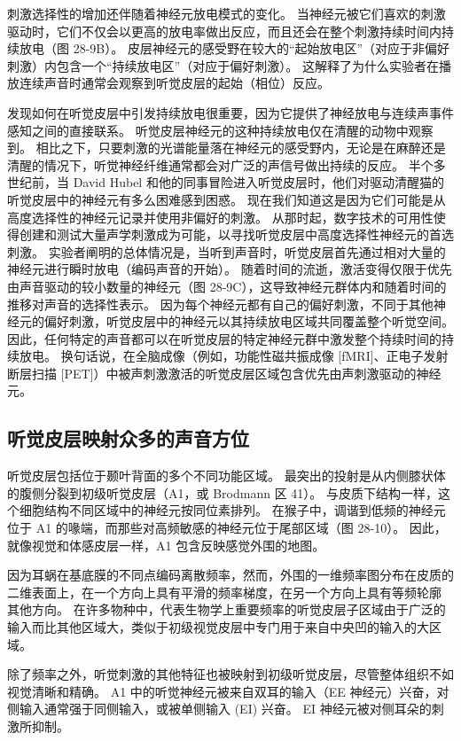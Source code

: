 刺激选择性的增加还伴随着神经元放电模式的变化。 当神经元被它们喜欢的刺激驱动时，它们不仅会以更高的放电率做出反应，而且还会在整个刺激持续时间内持续放电（图 28-9B）。 皮层神经元的感受野在较大的“起始放电区”（对应于非偏好刺激）内包含一个“持续放电区”（对应于偏好刺激）。 这解释了为什么实验者在播放连续声音时通常会观察到听觉皮层的起始（相位）反应。

发现如何在听觉皮层中引发持续放电很重要，因为它提供了神经放电与连续声事件感知之间的直接联系。 听觉皮层神经元的这种持续放电仅在清醒的动物中观察到。 相比之下，只要刺激的光谱能量落在神经元的感受野内，无论是在麻醉还是清醒的情况下，听觉神经纤维通常都会对广泛的声信号做出持续的反应。 半个多世纪前，当 David Hubel 和他的同事冒险进入听觉皮层时，他们对驱动清醒猫的听觉皮层中的神经元有多么困难感到困惑。 现在我们知道这是因为它们可能是从高度选择性的神经元记录并使用非偏好的刺激。 从那时起，数字技术的可用性使得创建和测试大量声学刺激成为可能，以寻找听觉皮层中高度选择性神经元的首选刺激。 实验者阐明的总体情况是，当听到声音时，听觉皮层首先通过相对大量的神经元进行瞬时放电（编码声音的开始）。 随着时间的流逝，激活变得仅限于优先由声音驱动的较小数量的神经元（图 28-9C），这导致神经元群体内和随着时间的推移对声音的选择性表示。 因为每个神经元都有自己的偏好刺激，不同于其他神经元的偏好刺激，听觉皮层中的神经元以其持续放电区域共同覆盖整个听觉空间。 因此，任何特定的声音都可以在听觉皮层的特定神经元群中激发整个持续时间的持续放电。 换句话说，在全脑成像（例如，功能性磁共振成像 [fMRI]、正电子发射断层扫描 [PET]）中被声刺激激活的听觉皮层区域包含优先由声刺激驱动的神经元。

\subsection{听觉皮层映射众多的声音方位}
听觉皮层包括位于颞叶背面的多个不同功能区域。 最突出的投射是从内侧膝状体的腹侧分裂到初级听觉皮层（A1，或 Brodmann 区 41）。 与皮质下结构一样，这个细胞结构不同区域中的神经元按同位素排列。 在猴子中，调谐到低频的神经元位于 A1 的喙端，而那些对高频敏感的神经元位于尾部区域（图 28-10）。 因此，就像视觉和体感皮层一样，A1 包含反映感觉外围的地图。

因为耳蜗在基底膜的不同点编码离散频率，然而，外围的一维频率图分布在皮质的二维表面上，在一个方向上具有平滑的频率梯度，在另一个方向上具有等频轮廓 其他方向。 在许多物种中，代表生物学上重要频率的听觉皮层子区域由于广泛的输入而比其他区域大，类似于初级视觉皮层中专门用于来自中央凹的输入的大区域。

除了频率之外，听觉刺激的其他特征也被映射到初级听觉皮层，尽管整体组织不如视觉清晰和精确。 A1 中的听觉神经元被来自双耳的输入（EE 神经元）兴奋，对侧输入通常强于同侧输入，或被单侧输入 (EI) 兴奋。 EI 神经元被对侧耳朵的刺激所抑制。

